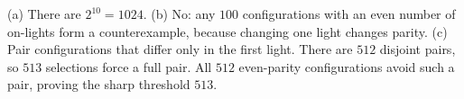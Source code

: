 (a) There are $\boxed{2^{10}=1024}$. (b) No: any $100$ configurations with an even number of on-lights form a counterexample, because changing one light changes parity. (c) Pair configurations that differ only in the first light. There are $512$ disjoint pairs, so $513$ selections force a full pair. All $512$ even-parity configurations avoid such a pair, proving the sharp threshold $\boxed{513}$.
